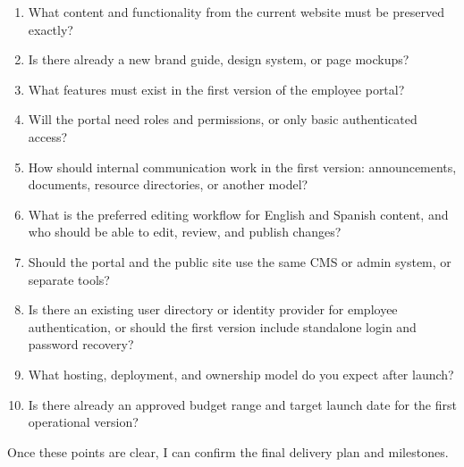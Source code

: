 \documentclass[11pt,a4paper]{article}
\begin{document}
\begin{enumerate}
\item What content and functionality from the current website must be preserved exactly?
\item Is there already a new brand guide, design system, or page mockups?
\item What features must exist in the first version of the employee portal?
\item Will the portal need roles and permissions, or only basic authenticated access?
\item How should internal communication work in the first version: announcements, documents, resource directories, or another model?
\item What is the preferred editing workflow for English and Spanish content, and who should be able to edit, review, and publish changes?
\item Should the portal and the public site use the same CMS or admin system, or separate tools?
\item Is there an existing user directory or identity provider for employee authentication, or should the first version include standalone login and password recovery?
\item What hosting, deployment, and ownership model do you expect after launch?
\item Is there already an approved budget range and target launch date for the first operational version?
\end{enumerate}

Once these points are clear, I can confirm the final delivery plan and milestones.\par
\end{document}
